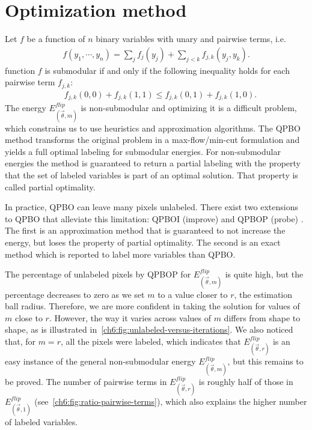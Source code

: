

\section{Optimization method}
\label{ch6:sec:optimization-method}

Let $f$ be a function of $n$ binary variables with unary and pairwise terms, i.e.
\begin{align*}
f(y_1,\cdots, y_n) = \sum_{j}{f_j(y_j)} + \sum_{j < k}{f_{j,k}(y_j,y_k)}.
\end{align*}
%
 function $f$ is submodular if and only if the following inequality holds for each pairwise term $f_{j,k}$: %
\begin{align*}
  \quad f_{j,k}(0,0) + f_{j,k}(1,1) \leq f_{j,k}(0,1) + f_{j,k}(1,0).
\end{align*}
%
The energy $E_{(\vec{\theta},m)}^{flip}$ is non-submodular and optimizing it is a difficult problem, which constrains us to use heuristics and
approximation algorithms. The QPBO method \cite{hammer84} transforms the original problem in a max-flow/min-cut
formulation and yields a full optimal labeling for submodular energies. For non-submodular energies the method is
guaranteed to return a partial labeling with the property that the set of labeled variables is part of an optimal
solution. That property is called partial optimality.

In practice, QPBO can leave many pixels unlabeled. There exist two extensions to QPBO that alleviate this limitation:
QPBOI (improve) and QPBOP (probe) \cite{rother07qpbo}. The first is an approximation method that is guaranteed to not increase the energy,
but loses the property of partial optimality. The second is an exact method which is reported to label more variables
than QPBO.

The percentage of unlabeled pixels by QPBOP for $E_{(\vec{\theta},m)}^{flip}$ is quite high, but the percentage decreases to zero as we set $m$
to a value closer to $r$, the estimation ball radius. Therefore, we are more confident in taking the solution for values of $m$ close to $r$. However, the way it
varies across values of $m$ differs from shape to shape, as is illustrated in~\cref{ch6:fig:unlabeled-versus-iterations}. We also noticed that, for $m=r$, all the pixels were labeled, which
  indicates that $E_{(\vec{\theta},r)}^{flip}$ is an easy instance of the general non-submodular energy $E_{(\vec{\theta},m)}^{flip}$, but this remains to be
  proved. The number of pairwise terms in $E_{(\vec{\theta},r)}^{flip}$ is roughly half of those in $E_{(\vec{\theta},1)}^{flip}$ (see~\cref{ch6:fig:ratio-pairwise-terms}), which also explains the higher number of labeled variables.

